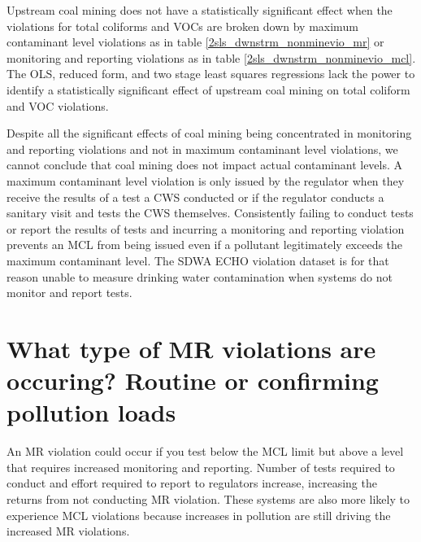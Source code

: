 \documentclass{article}
\begin{document}
Upstream coal mining does not have a statistically significant effect when the violations for total coliforms and VOCs are broken down by maximum contaminant level violations as in table \ref{2sls_dwnstrm_nonminevio_mr} or monitoring and reporting violations as in table \ref{2sls_dwnstrm_nonminevio_mcl}. The OLS, reduced form, and two stage least squares regressions lack the power to identify a statistically significant effect of upstream coal mining on total coliform and VOC violations.

Despite all the significant effects of coal mining being concentrated in monitoring and reporting violations and not in maximum contaminant level violations, we cannot conclude that coal mining does not impact actual contaminant levels. A maximum contaminant level violation is only issued by the regulator when they receive the results of a test a CWS conducted or if the regulator conducts a sanitary visit and tests the CWS themselves. Consistently failing to conduct tests or report the results of tests and incurring a monitoring and reporting violation prevents an MCL from being issued even if a pollutant legitimately exceeds the maximum contaminant level. The SDWA ECHO violation dataset is for that reason unable to measure drinking water contamination when systems do not monitor and report tests.













\newpage

\section{What type of MR violations are occuring? Routine or confirming pollution loads}

An MR violation could occur if you test below the MCL limit but above a level that requires increased monitoring and reporting. Number of tests required to conduct and effort required to report to regulators increase, increasing the returns from not conducting  MR violation. These systems are also more likely to experience MCL violations because increases in pollution are still driving the increased MR violations.
\end{document}
